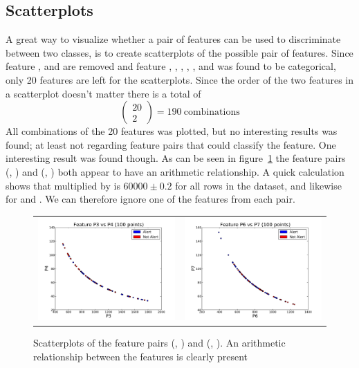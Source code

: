\subsection{Scatterplots}\label{sec:scatterplots}
A great way to visualize whether a pair of features can be used to discriminate between two classes, is to create scatterplots of the possible pair of features. Since feature ,  and  are removed and feature , , , , ,  and  was found to be categorical, only 20 features are left for the scatterplots. Since the order of the two features in a scatterplot doesn't matter there is a total of 
\[
    \begin{pmatrix}
        20 \\
        2
    \end{pmatrix} = 190\:\text{combinations}
\]
All combinations of the 20 features was plotted, but no interesting results was found; at least not regarding feature pairs that could classify the  feature. One interesting result was found though. As can be seen in figure~\ref{fig:scatterplots} the feature pairs (, ) and (, ) both appear to have an arithmetic relationship. A quick calculation shows that  multiplied by  is $60000\pm0.2$ for all rows in the dataset, and likewise for  and . We can therefore ignore one of the features from each pair.
\begin{figure}
    \begin{tabularx}{\textwidth}{ X X }
        \includegraphics[width=.5\textwidth]{../sessions/24-writing-helper-scripts/plots/scatterplots/P3-P4.pdf} &
        \includegraphics[width=.5\textwidth]{../sessions/24-writing-helper-scripts/plots/scatterplots/P6-P7.pdf}
    \end{tabularx}
    \caption{Scatterplots of the feature pairs (, ) and (, ). An arithmetic relationship between the features is clearly present}\label{fig:scatterplots}
\end{figure}


